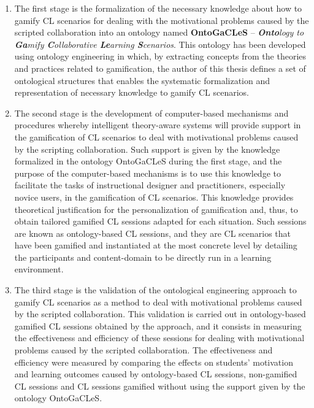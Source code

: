 \begin{enumerate}
\item
The first stage is the formalization of the necessary knowledge about how to gamify CL scenarios for dealing with the motivational problems caused by the scripted collaboration into an ontology named \textbf{OntoGaCLeS} – \emph{\textbf{Onto}logy to \textbf{Ga}mify \textbf{C}ollaborative \textbf{Le}arning \textbf{S}cenarios}. This ontology has been developed using ontology engineering in which, by extracting concepts from the theories and practices related to gamification, the author of this thesis defines a set of ontological structures that enables the systematic formalization and representation of necessary knowledge to gamify CL scenarios.

\item
The second stage is the development of computer-based mechanisms and procedures whereby intelligent theory-aware systems will provide support in the gamification of CL scenarios to deal with motivational problems caused by the scripting collaboration. Such support is given by the knowledge formalized in the ontology OntoGaCLeS during the first stage, and the purpose of the computer-based mechanisms is to use this knowledge to facilitate the tasks of instructional designer and practitioners, especially novice users, in the gamification of CL scenarios. This knowledge provides theoretical justification for the personalization of gamification and, thus, to obtain tailored gamified CL sessions adapted for each situation. Such sessions are known as ontology-based CL sessions, and they are CL scenarios that have been gamified and instantiated at the most concrete level by detailing the participants and content-domain to be directly run in a learning environment.

\item
The third stage is the validation of the ontological engineering approach to gamify CL scenarios as a method to deal with motivational problems caused by the scripted collaboration. This validation is carried out in ontology-based gamified CL sessions obtained by the approach, and it consists in measuring the effectiveness and efficiency of these sessions for dealing with motivational problems caused by the scripted collaboration. The effectiveness and efficiency were measured by comparing the effects on students' motivation and learning outcomes caused by ontology-based CL sessions, non-gamified CL sessions and CL sessions gamified without using the support given by the ontology OntoGaCLeS.
\end{enumerate}

